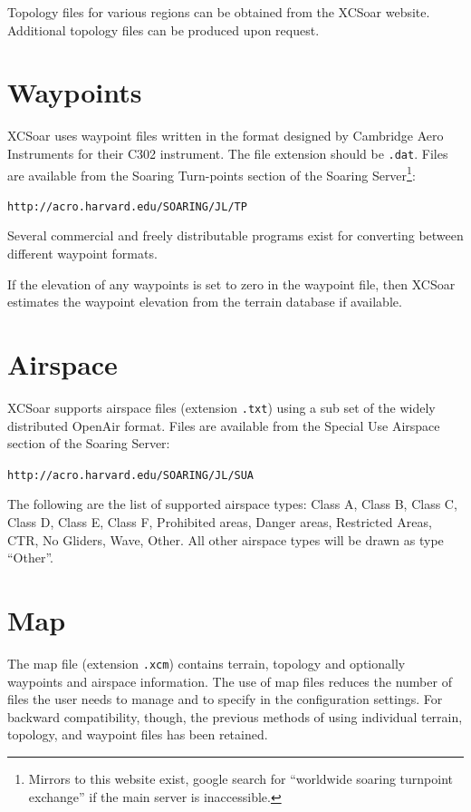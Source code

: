 \documentclass[a4paper,12pt]{refrep}
\begin{document}
Topology files for various regions can be obtained from the XCSoar
website.  Additional topology files can be produced upon request.

\section{Waypoints}

XCSoar uses waypoint files written in the format designed by Cambridge
Aero Instruments for their C302 instrument.  The file extension should
be \verb|.dat|.
Files are available from the Soaring Turn-points section of the
Soaring Server\footnote{Mirrors to this website exist, google search
for ``worldwide soaring turnpoint exchange'' if the main server is
inaccessible.}:

\verb|http://acro.harvard.edu/SOARING/JL/TP|

Several commercial and freely distributable programs exist for
converting between different waypoint formats.

If the elevation of any waypoints is set to zero in the waypoint file,
then XCSoar estimates the waypoint elevation from the terrain database
if available.

\section{Airspace}

XCSoar supports airspace files (extension \verb|.txt|) using a sub set
of the widely distributed OpenAir format. Files are available from the
Special Use Airspace section of the Soaring Server:

\verb|http://acro.harvard.edu/SOARING/JL/SUA|


The following are the list of supported airspace types: Class A, Class
B, Class C, Class D, Class E, Class F, Prohibited areas, Danger areas,
Restricted Areas, CTR, No Gliders, Wave, Other.  All other airspace
types will be drawn as type ``Other''.

\section{Map}\label{sec:map}

The map file (extension \verb|.xcm|) contains terrain, topology and
optionally waypoints and airspace information.  The use of map files
reduces the number of files the user needs to manage and to specify in
the configuration settings.  For backward compatibility, though, the
previous methods of using individual terrain, topology, and waypoint
files has been retained.
\end{document}
